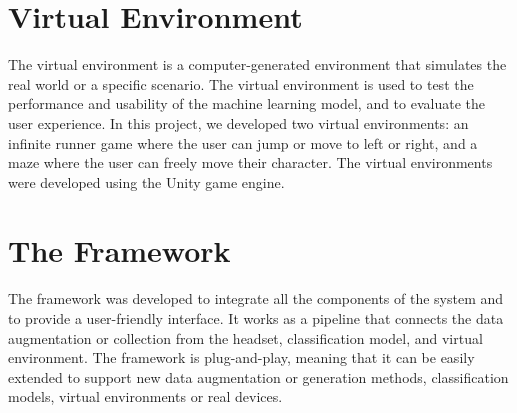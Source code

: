 \section{Virtual Environment}
The virtual environment is a computer-generated environment that simulates the real world or a specific scenario.
The virtual environment is used to test the performance and usability of the machine learning model, and to evaluate the user experience.
In this project, we developed two virtual environments: an infinite runner game where the user can jump or move to left or right, and a maze where the user can freely move their character.
The virtual environments were developed using the Unity game engine.

\section{The Framework}
The framework was developed to integrate all the components of the system and to provide a user-friendly interface.
It works as a pipeline that connects the data augmentation or collection from the headset, classification model, and virtual environment.
The framework is plug-and-play, meaning that it can be easily extended to support new data augmentation or generation methods, classification models, virtual environments or real devices.

